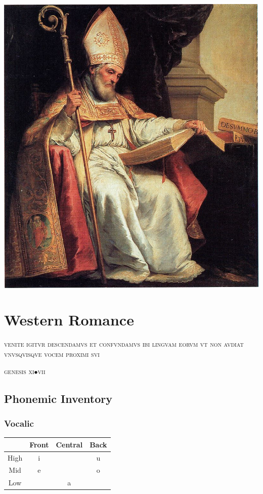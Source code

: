 \documentclass{report}[12pt]
\begin{document}
\includegraphics[scale=5.0]{isidorus.jpeg}

\thispagestyle{empty}

\pagebreak

\chapter{Western Romance}\label{cap:western_romance}

\epigraph{\textsc{venite igitvr descendamvs et confvndamvs ibi lingvam eorvm vt non avdiat vnvsqvisqve vocem proximi svi}}{\textsc{genesis} \textsc{xi}$\bullet$\textsc{vii}}

\section{Phonemic Inventory}

\subsection{Vocalic}

\begin{tcolorbox}[title=Western Romance Monophthongs, hbox]
  \begin{tabular}{|c|c|c|c|}
    \hline
    & Front & Central & Back \\
    \hline
    High & i & & u \\
    \hline
    Mid & e & & o \\
    \hline
    Low & & a & \\
    \hline
  \end{tabular}
\end{tcolorbox}
\end{document}
